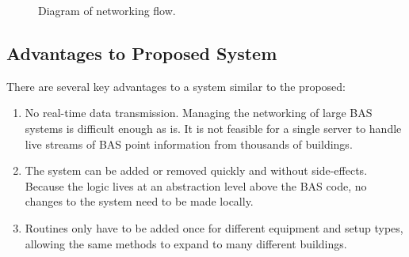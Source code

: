 \begin{figure}
\caption{Diagram of networking flow.}
\label{fig:NetworkFlow}
\end{figure}


\subsection{Advantages to Proposed System}

There are several key advantages to a system similar to the proposed:

\begin{enumerate}
    \item No real-time data transmission. Managing the networking of large BAS systems is difficult enough as is. It is not feasible for a single server to handle live streams of BAS point information from thousands of buildings. 

    \item The system can be added or removed quickly and without side-effects. Because the logic lives at an abstraction level above the BAS code, no changes to the system need to be made locally. 

    \item Routines only have to be added once for different equipment and setup types, allowing the same methods to expand to many different buildings. 


\end{enumerate}
